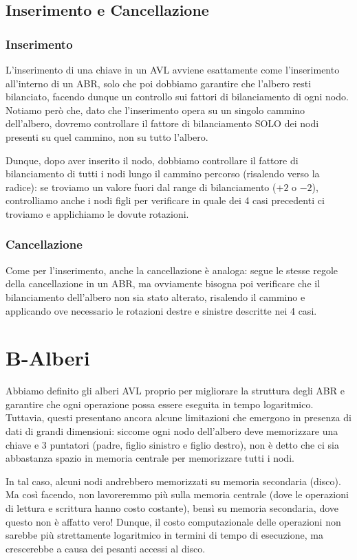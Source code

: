 \documentclass[12pt]{report}
\begin{document}
	\subsection{Inserimento e Cancellazione}
	
	\subsubsection*{Inserimento}
	L'inserimento di una chiave in un AVL avviene esattamente come l'inserimento all'interno di un ABR, solo che poi dobbiamo garantire che l'albero resti bilanciato, facendo dunque un controllo sui fattori di bilanciamento di ogni nodo. Notiamo però che, dato che l'inserimento opera su un singolo cammino dell'albero, dovremo controllare il fattore di bilanciamento SOLO dei nodi presenti su quel cammino, non su tutto l'albero.
	
	Dunque, dopo aver inserito il nodo, dobbiamo controllare il fattore di bilanciamento di tutti i nodi lungo il cammino percorso (risalendo verso la radice): se troviamo un valore fuori dal range di bilanciamento ($+2$ o $-2$), controlliamo anche i nodi figli per verificare in quale dei 4 casi precedenti ci troviamo e applichiamo le dovute rotazioni.
	
	\subsubsection*{Cancellazione}
	Come per l'inserimento, anche la cancellazione è analoga: segue le stesse regole della cancellazione in un ABR, ma ovviamente bisogna poi verificare che il bilanciamento dell'albero non sia stato alterato, risalendo il cammino e applicando ove necessario le rotazioni destre e sinistre descritte nei 4 casi.
	
	\newpage
	\section{B-Alberi}
	Abbiamo definito gli alberi AVL proprio per migliorare la struttura degli ABR e garantire che ogni operazione possa essere eseguita in tempo logaritmico. Tuttavia, questi presentano ancora alcune limitazioni che emergono in presenza di dati di grandi dimensioni: siccome ogni nodo dell'albero deve memorizzare una chiave e 3 puntatori (padre, figlio sinistro e figlio destro), non è detto che ci sia abbastanza spazio in memoria centrale per memorizzare tutti i nodi. 
	
	In tal caso, alcuni nodi andrebbero memorizzati su memoria secondaria (disco). Ma così facendo, non lavoreremmo più sulla memoria centrale (dove le operazioni di lettura e scrittura hanno costo costante), bensì su memoria secondaria, dove questo non è affatto vero! Dunque, il costo computazionale delle operazioni non sarebbe più strettamente logaritmico in termini di tempo di esecuzione, ma crescerebbe a causa dei pesanti accessi al disco.
	
\end{document}
